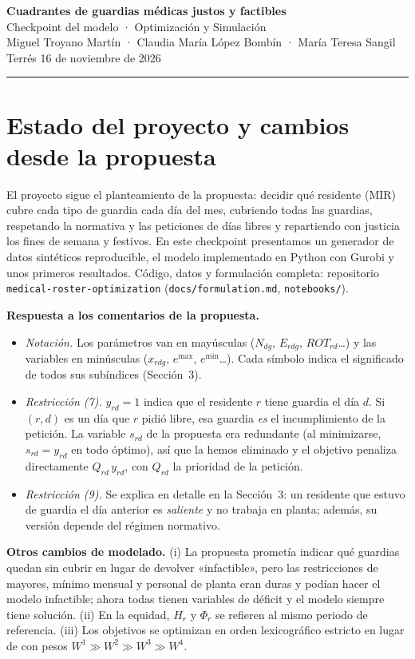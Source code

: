 \documentclass[10pt,a4paper]{article}
\begin{document}
{\LARGE\bfseries Cuadrantes de guardias médicas justos y factibles}\\[2pt]
{\large Checkpoint del modelo · Optimización y Simulación}\\[2pt]
{\small Miguel Troyano Martín · Claudia María López Bombín · María Teresa Sangil Terrés \hfill 16 de noviembre de 2026}\\[-4pt]
\rule{\linewidth}{0.8pt}

\section{Estado del proyecto y cambios desde la propuesta}

El proyecto sigue el planteamiento de la propuesta: decidir qué residente (MIR) cubre cada tipo de guardia cada día del mes, cubriendo todas las guardias, respetando la normativa y las peticiones de días libres y repartiendo con justicia los fines de semana y festivos. En este checkpoint presentamos un generador de datos sintéticos reproducible, el modelo implementado en Python con Gurobi y unos primeros resultados. Código, datos y formulación completa: repositorio \texttt{medical-roster-optimization} (\texttt{docs/formulation.md}, \texttt{notebooks/}).

\textbf{Respuesta a los comentarios de la propuesta.}
\begin{itemize}
  \item \emph{Notación.} Los parámetros van en mayúsculas ($N_{dg}$, $E_{rdg}$, $ROT_{rd}$\dots) y las variables en minúsculas ($x_{rdg}$, $e^{\max}$, $e^{\min}$\dots). Cada símbolo indica el significado de todos sus subíndices (Sección~3).
  \item \emph{Restricción (7).} $y_{rd}=1$ indica que el residente $r$ tiene guardia el día $d$. Si $(r,d)$ es un día que $r$ pidió libre, esa guardia \emph{es} el incumplimiento de la petición. La variable $s_{rd}$ de la propuesta era redundante (al minimizarse, $s_{rd}=y_{rd}$ en todo óptimo), así que la hemos eliminado y el objetivo penaliza directamente $Q_{rd}\,y_{rd}$, con $Q_{rd}$ la prioridad de la petición.
  \item \emph{Restricción (9).} Se explica en detalle en la Sección~3: un residente que estuvo de guardia el día anterior es \emph{saliente} y no trabaja en planta; además, su versión depende del régimen normativo.
\end{itemize}

\textbf{Otros cambios de modelado.} (i) La propuesta prometía indicar qué guardias quedan sin cubrir en lugar de devolver «infactible», pero las restricciones de mayores, mínimo mensual y personal de planta eran duras y podían hacer el modelo infactible; ahora todas tienen variables de déficit y el modelo siempre tiene solución. (ii) En la equidad, $H_r$ y $\Phi_r$ se refieren al mismo periodo de referencia. (iii) Los objetivos se optimizan en orden lexicográfico estricto en lugar de con pesos $W^1\gg W^2\gg W^3\gg W^4$.
\end{document}
